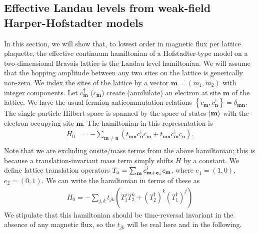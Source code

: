 \documentclass[aps,prb,twocolumn,letterpaper,twoside,nobalancelastpage,groupedaddress,amsmath,amssymb,floatfix,citeautoscript]{revtex4-1}
\begin{document}
\subsection{Effective Landau levels from weak-field Harper-Hofstadter models}
\label{landau-level-limit}
In this section, we will show that, to lowest order in magnetic flux per lattice plaquette, the effective continuum hamiltonian of a Hofstadter-type model on a two-dimensional Bravais lattice is the Landau level hamiltonian. We will assume that the hopping amplitude between any two sites on the lattice is generically non-zero. We index the sites of the lattice by a vector $\mathbf{m} = (m_1, m_2)$ with integer components. Let $c^{\dag}_{\mathbf{m}}$ ($c_{\mathbf{m}}$) create (annihilate) an electron at site $\mathbf{m}$ of the lattice. We have the usual fermion anticommutation relations $\left\{c_{\mathbf{m}},c_{\mathbf{n}}^{\dag}\right\} = \delta_{\mathbf{m} \mathbf{n}}$. The single-particle Hilbert space is spanned by the space of states $\ket{\mathbf{m}}$ with the electron occupying site $\mathbf{m}$. The hamiltonian in this representation is
\begin{align*}
H_0 &= -\sum_{\mathbf{m}\neq \mathbf{n}}\left( t_{\mathbf{m}\mathbf{n}} c^{\dag}_\mathbf{n} c_\mathbf{m}  + t_{\mathbf{n}\mathbf{m}} c^{\dag}_{\mathbf{m}} c_{\mathbf{n}}\right).\\
\end{align*}
Note that we are excluding onsite/mass terms from the above hamiltonian; this is because a translation-invariant mass term simply shifts $H$ by a constant. We define lattice translation operators $T_a = \sum_{\mathbf{m}} c^{\dag}_{\mathbf{m} + \mathbf{e}_a}c_{\mathbf{m}}$, where $e_1=(1,0)$, $e_2=(0,1)$. We can write the hamiltonian in terms of these as
\begin{align}
\label{eq-b0-lattice-hamiltonian}
H_0 = -\sum_{j,k} t_{jk} \left(T_1^j T_2^k + (T^{\dag}_2)^{k} (T^{\dag}_1)^{j}\right)
\end{align}
We stipulate that this hamiltonian should be time-reversal invariant in the absence of any magnetic flux, so the $t_{jk}$ will be real here and in the following.
\end{document}
